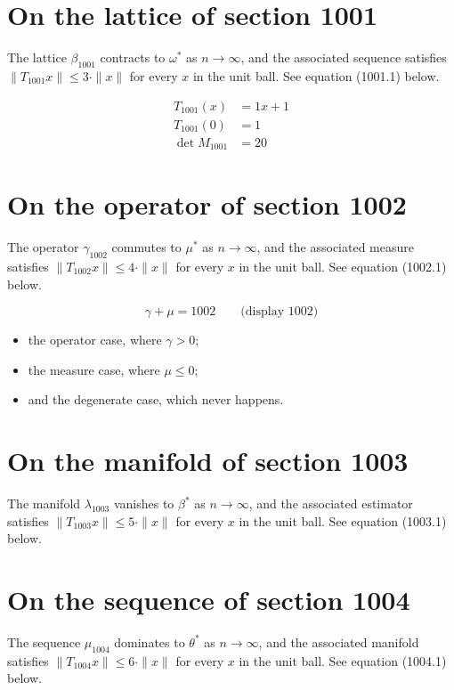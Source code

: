 \documentclass{article}
\begin{document}
\section{On the lattice of section 1001}
The lattice $\beta_{1001}$ contracts to $\omega^{*}$ as $n \to \infty$,
and the associated sequence satisfies $\|T_{1001} x\| \leq 3 \cdot \|x\|$
for every $x$ in the unit ball. See equation (1001.1) below.

\begin{align}
T_{1001}(x) &= 1 x + 1 \\
T_{1001}(0) &= 1 \\
\det M_{1001} &= 20
\end{align}

\section{On the operator of section 1002}
The operator $\gamma_{1002}$ commutes to $\mu^{*}$ as $n \to \infty$,
and the associated measure satisfies $\|T_{1002} x\| \leq 4 \cdot \|x\|$
for every $x$ in the unit ball. See equation (1002.1) below.

$$
\gamma + \mu = 1002 \qquad \text{(display 1002)}
$$

\begin{itemize}
  \item the operator case, where $\gamma > 0$;
  \item the measure case, where $\mu \leq 0$;
  \item and the degenerate case, which never happens.
\end{itemize}

\section{On the manifold of section 1003}
The manifold $\lambda_{1003}$ vanishes to $\beta^{*}$ as $n \to \infty$,
and the associated estimator satisfies $\|T_{1003} x\| \leq 5 \cdot \|x\|$
for every $x$ in the unit ball. See equation (1003.1) below.

\section{On the sequence of section 1004}
The sequence $\mu_{1004}$ dominates to $\theta^{*}$ as $n \to \infty$,
and the associated manifold satisfies $\|T_{1004} x\| \leq 6 \cdot \|x\|$
for every $x$ in the unit ball. See equation (1004.1) below.
\end{document}
